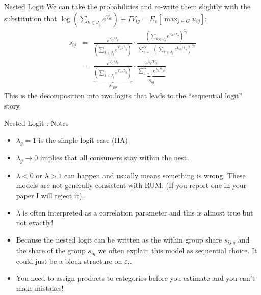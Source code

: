 \begin{frame}{Nested Logit}
We can take the probabilities and re-write them slightly with the substitution that
$\log \left(\sum_{k \in J_g} e^{V_{ik}} \right)\equiv IV_{ig}=E_{\varepsilon}[\max_{j \in G} u_{ij}]$:
\begin{eqnarray*}
s_{ij} &=& \frac{ e^{V_{ij}/\lambda_g}}{ \left(\sum_{k \in J_g} e^{V_{ik}/\lambda_g} \right)}
\cdot
\frac{ \left(\sum_{k \in J_g} e^{V_{ik}/\lambda_g} \right)^{\lambda_g}}{\sum_{h=1}^G \left(\sum_{k \in J_h} e^{V_{ik}/\lambda_h} \right)^{\lambda_h}} \\
&=& \underbrace{\frac{ e^{V_{ij}/\lambda_g}}{ \left(\sum_{k \in J_g} e^{V_{ik}/\lambda_g} \right)}}_{s_{i j | g}}
\cdot
\underbrace{\frac{e^{\lambda_g IV_{ig}}}{\sum_{h=1}^{G} e^{\lambda_h IV_{ih}} }}_{s_{ig}}
\end{eqnarray*}
This is the decomposition into two logits that leads to the ``sequential logit'' story.
\end{frame}



\begin{frame}{Nested Logit : Notes}
\begin{itemize}
\item $\lambda_g=1$ is the simple logit case (IIA)
\item $\lambda_g \rightarrow 0$ implies that all consumers stay within the nest.
\item $\lambda < 0$ or $\lambda > 1$ can happen and usually means something is wrong. These models are not generally consistent with RUM. (If you report one in your paper I will reject it).
\item $\lambda$ is often interpreted as a correlation parameter and this is almost true but not exactly!
\item Because the nested logit can be written as the within group share $s_{ij|g}$ and the share of the group $s_{ig}$ we often explain this model as \alert{sequential choice}. It could just be a \alert{block structure} on $\varepsilon_i$.
\item You need to assign products to categories \alert{before you estimate} and you can't make mistakes!
\end{itemize}
\end{frame}

